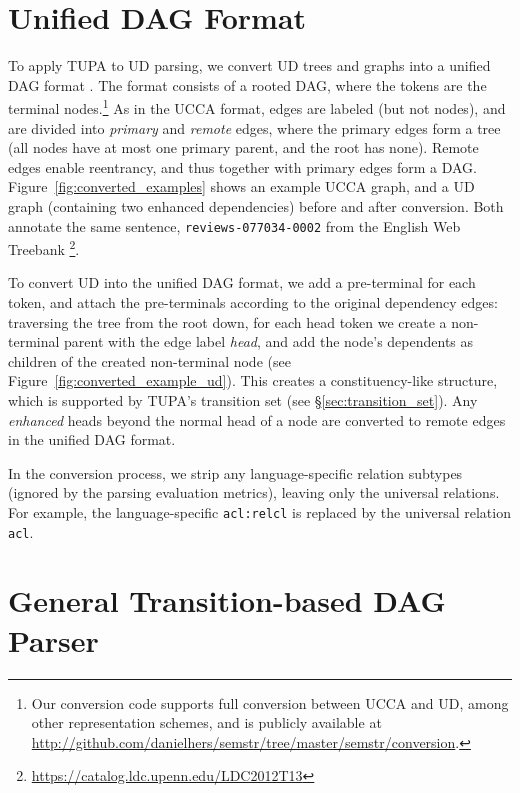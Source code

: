 \documentclass[11pt,a4paper]{article}
\begin{document}
\section{Unified DAG Format}\label{sec:format}

To apply TUPA to UD parsing,
we convert UD trees and graphs into a unified DAG format \cite{hershcovich2018multitask}.
The format consists of a rooted DAG, where the tokens are the terminal
nodes.\footnote{Our conversion code supports full conversion between UCCA and UD,
among other representation schemes,
and is publicly available at \url{http://github.com/danielhers/semstr/tree/master/semstr/conversion}.}
As in the UCCA format, edges are labeled (but not nodes),
and are divided into \textit{primary} and \textit{remote} edges,
where the primary edges form a tree (all nodes have at most one primary parent,
and the root has none).
Remote edges enable reentrancy, and thus together with primary edges
form a DAG.
Figure~\ref{fig:converted_examples} shows an example UCCA graph,
and a UD graph (containing two enhanced dependencies) before and after conversion.
Both annotate the same sentence, \verb|reviews-077034-0002| from the
English Web Treebank \cite{L14-1067}\footnote{\url{https://catalog.ldc.upenn.edu/LDC2012T13}}.

To convert UD into the unified DAG format,
we add a pre-terminal for each token,
and attach the pre-terminals according to the original dependency edges:
traversing the tree from the root down, for each head token we create a non-terminal
parent with the edge label {\it head},
and add the node's dependents as children of the created non-terminal node
(see Figure~\ref{fig:converted_example_ud}).
This creates a constituency-like structure,
which is supported by TUPA's transition set (see \S\ref{sec:transition_set}).
Any \textit{enhanced}
heads beyond the normal head of a node are converted to remote edges in the unified DAG format.

In the conversion process, we strip any language-specific relation subtypes
(ignored by the parsing evaluation metrics),
leaving only the universal relations.
For example, the language-specific \verb|acl:relcl| is replaced by the universal relation \verb|acl|.


\section{General Transition-based DAG Parser}\label{sec:model}
\end{document}
